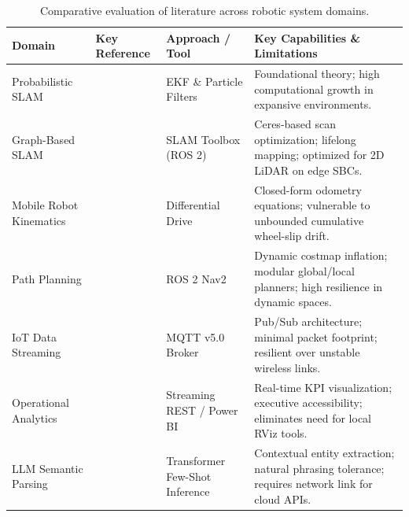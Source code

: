 \begin{table}[htbp]
\centering
\caption{Comparative evaluation of literature across robotic system domains.}
\label{tab:literature_matrix}
\renewcommand{\arraystretch}{1.3}
\begin{tabular}{>{\raggedright\arraybackslash}p{2.8cm} >{\raggedright\arraybackslash}p{2.5cm} >{\raggedright\arraybackslash}p{3.0cm} >{\raggedright\arraybackslash}p{5.5cm}}
\hline
\textbf{Domain} & \textbf{Key Reference} & \textbf{Approach / Tool} & \textbf{Key Capabilities \& Limitations} \\ \hline
Probabilistic SLAM & \citet{thrun2005probabilistic} & EKF \& Particle Filters & Foundational theory; high computational growth in expansive environments. \\ \hline
Graph-Based SLAM & \citet{macenski2021slam} & SLAM Toolbox (ROS 2) & Ceres-based scan optimization; lifelong mapping; optimized for 2D LiDAR on edge SBCs. \\ \hline
Mobile Robot Kinematics & \citet{siegwart2011introduction} & Differential Drive & Closed-form odometry equations; vulnerable to unbounded cumulative wheel-slip drift. \\ \hline
Path Planning & \citet{openrobotics2024nav2} & ROS 2 Nav2 & Dynamic costmap inflation; modular global/local planners; high resilience in dynamic spaces. \\ \hline
IoT Data Streaming & \citet{oasis2019mqtt} & MQTT v5.0 Broker & Pub/Sub architecture; minimal packet footprint; resilient over unstable wireless links. \\ \hline
Operational Analytics & \citet{microsoft2024powerbi} & Streaming REST / Power BI & Real-time KPI visualization; executive accessibility; eliminates need for local RViz tools. \\ \hline
LLM Semantic Parsing & \citet{brown2020language, openai2024gpt} & Transformer Few-Shot Inference & Contextual entity extraction; natural phrasing tolerance; requires network link for cloud APIs. \\ \hline
\end{tabular}
\end{table}


